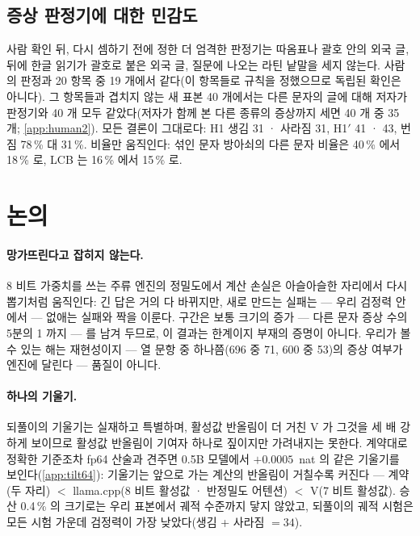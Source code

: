 \documentclass[11pt]{article}
\begin{document}
\subsection{증상 판정기에 대한 민감도}\label{sec:sensitivity}

사람 확인 뒤, 다시 셈하기 전에 정한 더 엄격한 판정기는 따옴표나 괄호 안의 외국 글, 뒤에 한글 읽기가 괄호로 붙은 외국 글,
질문에 나오는 라틴 낱말을 세지 않는다. 사람의 판정과 20 항목 중 19 개에서 같다(이 항목들로 규칙을 정했으므로 독립된 확인은
아니다). 그 항목들과 겹치지 않는 새 표본 40 개에서는 다른 문자의 글에 대해 저자가 판정기와 40 개 모두 같았다(저자가 함께 본 다른 종류의
증상까지 세면 40 개 중 35 개; \ref{app:human2}). 모든 결론이 그대로다: H1 생김 31 · 사라짐
31, H1$'$ 41 · 43, 번짐 78\,\% 대 31\,\%. 비율만 움직인다: 섞인 문자 방아쇠의 다른 문자 비율은 40\,\% 에서 18\,\% 로, LCB 는
16\,\% 에서 15\,\% 로.

\section{논의}\label{sec:discussion}

\paragraph{망가뜨린다고 잡히지 않는다.}
8 비트 가중치를 쓰는 주류 엔진의 정밀도에서 계산 손실은 아슬아슬한 자리에서 다시 뽑기처럼 움직인다: 긴 답은 거의 다 바뀌지만,
새로 만드는 실패는 --- 우리 검정력 안에서 --- 없애는 실패와 짝을 이룬다. 구간은 보통 크기의 증가 --- 다른 문자 증상 수의 5분의 1
까지 --- 를 남겨 두므로, 이 결과는 한계이지 부재의 증명이 아니다. 우리가 볼 수 있는 해는 재현성이지 --- 열 문항 중 하나쯤(696 중
71, 600 중 53)의 증상 여부가 엔진에 달린다 --- 품질이 아니다.

\paragraph{하나의 기울기.}
되풀이의 기울기는 실재하고 특별하며, 활성값 반올림이 더 거친 V 가 그것을 세 배 강하게 보이므로 활성값 반올림이 기여자 하나로
짚이지만 가려내지는 못한다. 계약대로 정확한 기준조차 fp64 산술과 견주면 0.5B 모델에서 $+0.0005$~nat 의 같은 기울기를
보인다(\ref{app:tilt64}): 기울기는 앞으로 가는 계산의 반올림이 거칠수록 커진다 --- 계약(두 자리) $<$ llama.cpp(8 비트 활성값 ·
반정밀도 어텐션) $<$ V(7 비트 활성값). 승산 0.4\,\% 의 크기로는 우리 표본에서 궤적 수준까지 닿지 않았고, 되풀이의 궤적 시험은
모든 시험 가운데 검정력이 가장 낮았다(생김 + 사라짐 $=34$).
\end{document}
